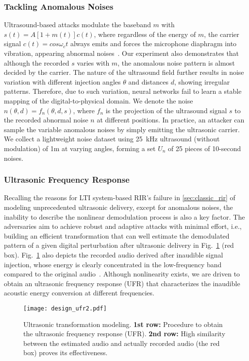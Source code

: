 \subsubsection{Tackling Anomalous Noises}\label{sec:design_noise}
Ultrasound-based attacks modulate the baseband $m$ with $s(t)={A}{[1+m(t)]}c(t)$, where regardless of the energy of $m$, the carrier signal $c(t)=cos\omega_{c}t$ always emits and forces the microphone diaphragm into vibration, appearing abnormal noises~\cite{li2023learning}. 
Our experiment also demonstrates that although the recorded $s$ varies with $m$, the anomalous noise pattern is almost decided by the carrier. 
The nature of the ultrasound field further results in noise variation with different injection angles $\theta$ and distances $d$, showing irregular patterns. Therefore, due to such variation, neural networks fail to learn a stable mapping of the digital-to-physical domain.
We denote the noise $n(\theta,d)=f_n(\theta,d,s)$, where $f_n$ is the projection of the ultrasound signal $s$ to the recorded abnormal noise $n$ at different positions. 
In practice, an attacker can sample the variable anomalous noises by simply emitting the ultrasonic carrier. We collect a lightweight noise dataset using 25~kHz ultrasound (without modulation) of 1m at varying angles, forming a set $U_n$ of 25 pieces of 10-second noises.


\subsubsection{Ultrasonic Frequency Response}\label{sec:design_ufr}
Recalling the reasons for LTI system-based RIR's failure in \textsection\ref{sec:classic_rir} of modeling unprecedented ultrasonic delivery, except for anomalous noises, the inability to describe the nonlinear demodulation process is also a key factor. 
The adversaries aim to achieve robust and adaptive attacks with minimal effort, i.e., building an efficient transformation that can well estimate the demodulated pattern of a given digital perturbation after ultrasonic delivery in Fig.~\ref{fig:design_ufr} (red box). 
Fig.~\ref{fig:design_ufr} also depicts the recorded audio derived after inaudible signal injection, whose energy is clearly concentrated in the low-frequency band compared to the original audio~\cite{roy2018inaudible}.
Although nonlinearity exists, we are driven to obtain an ultrasonic frequency response (UFR) that characterizes the inaudible acoustic energy conversion at different frequencies.

\begin{figure}[t]
	\centering
	\texttt{[image: design\_ufr2.pdf]}
	\caption{\label{fig:design_ufr}Ultrasonic transformation modeling. \textbf{1st row:} Procedure to obtain the ultrasonic frequency response (UFR). \textbf{2nd row:} High similarity between the estimated audio and actually recorded audio (the red box) proves its effectiveness.}
	\vspace{-15pt}
\end{figure}

